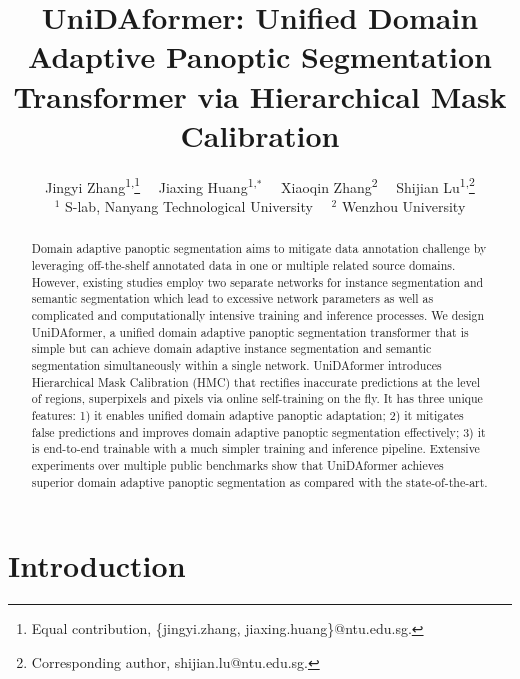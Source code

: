 \documentclass[10pt,twocolumn,letterpaper]{article}
\begin{document}
\title{UniDAformer: Unified Domain Adaptive Panoptic Segmentation Transformer via Hierarchical Mask Calibration}

\author{Jingyi Zhang\textsuperscript{\rm 1,}\thanks{Equal contribution, \{jingyi.zhang, jiaxing.huang\}@ntu.edu.sg.} \ \ Jiaxing Huang\textsuperscript{\rm 1,}$^*$ \  \  Xiaoqin Zhang\textsuperscript{\rm 2} \ \ Shijian Lu\textsuperscript{\rm 1,}\thanks{Corresponding author, shijian.lu@ntu.edu.sg.} 
\\
$^1$ S-lab, Nanyang Technological University \ \  $^2$ Wenzhou University
\\
}
\maketitle

\begin{abstract}

Domain adaptive panoptic segmentation aims to mitigate data annotation challenge by leveraging off-the-shelf annotated data in one or multiple related source domains. However, existing studies employ two separate networks for instance segmentation and semantic segmentation which lead to excessive network parameters as well as complicated and computationally intensive training and inference processes. We design UniDAformer, a unified domain adaptive panoptic segmentation transformer that is simple but can achieve domain adaptive instance segmentation and semantic segmentation simultaneously within a single network. UniDAformer introduces Hierarchical Mask Calibration (HMC) that rectifies inaccurate predictions at the level of regions, superpixels and pixels via online self-training on the fly. It has three unique features: 1) it enables unified domain adaptive panoptic adaptation; 2) it mitigates false predictions and improves domain adaptive panoptic segmentation effectively; 3) it is end-to-end trainable with a much simpler training and inference pipeline. Extensive experiments over multiple public benchmarks show that UniDAformer achieves superior domain adaptive panoptic segmentation as compared with the state-of-the-art.
\end{abstract}

\section{Introduction}
\end{document}

